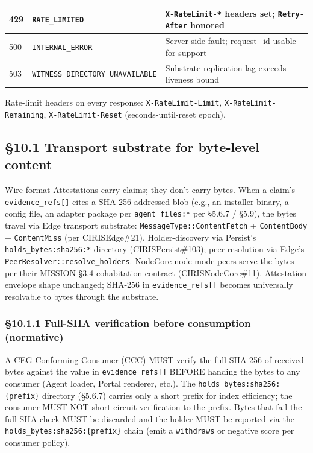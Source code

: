 \documentclass[11pt]{article}
\begin{document}
{\begin{longtable}{|p{5.33cm}|p{5.33cm}|p{5.33cm}|}
429 & \texttt{RATE\_LIMITED} & \texttt{X-RateLimit-*} headers set; \texttt{Retry-After} honored \\ \hline
500 & \texttt{INTERNAL\_ERROR} & Server-side fault; request\_id usable for support \\ \hline
503 & \texttt{WITNESS\_DIRECTORY\_UNAVAILABLE} & Substrate replication lag exceeds liveness bound \\ \hline
\end{longtable}}


Rate-limit headers on every response: \texttt{X-RateLimit-Limit}, \texttt{X-RateLimit-Remaining}, \texttt{X-RateLimit-Reset} (seconds-until-reset epoch).


\subsection*{§10.1 Transport substrate for byte-level content}


Wire-format Attestations carry claims; they don't carry bytes. When a claim's \texttt{evidence\_refs[]} cites a SHA-256-addressed blob (e.g., an installer binary, a config file, an adapter package per \texttt{agent\_files:*} per §5.6.7 / §5.9), the bytes travel via Edge transport substrate: \texttt{MessageType::ContentFetch} + \texttt{ContentBody} + \texttt{ContentMiss} (per CIRISEdge\#21). Holder-discovery via Persist's \texttt{holds\_bytes:sha256:*} directory (CIRISPersist\#103); peer-resolution via Edge's \texttt{PeerResolver::resolve\_holders}. NodeCore node-mode peers serve the bytes per their MISSION §3.4 cohabitation contract (CIRISNodeCore\#11). Attestation envelope shape unchanged; SHA-256 in \texttt{evidence\_refs[]} becomes universally resolvable to bytes through the substrate.


\subsubsection*{§10.1.1 Full-SHA verification before consumption (normative)}


A CEG-Conforming Consumer (CCC) MUST verify the full SHA-256 of received bytes against the value in \texttt{evidence\_refs[]} BEFORE handing the bytes to any consumer (Agent loader, Portal renderer, etc.). The \texttt{holds\_bytes:sha256:\{prefix\}} directory (§5.6.7) carries only a short prefix for index efficiency; the consumer MUST NOT short-circuit verification to the prefix. Bytes that fail the full-SHA check MUST be discarded and the holder MUST be reported via the \texttt{holds\_bytes:sha256:\{prefix\}} chain (emit a \texttt{withdraws} or negative score per consumer policy).
\end{document}
